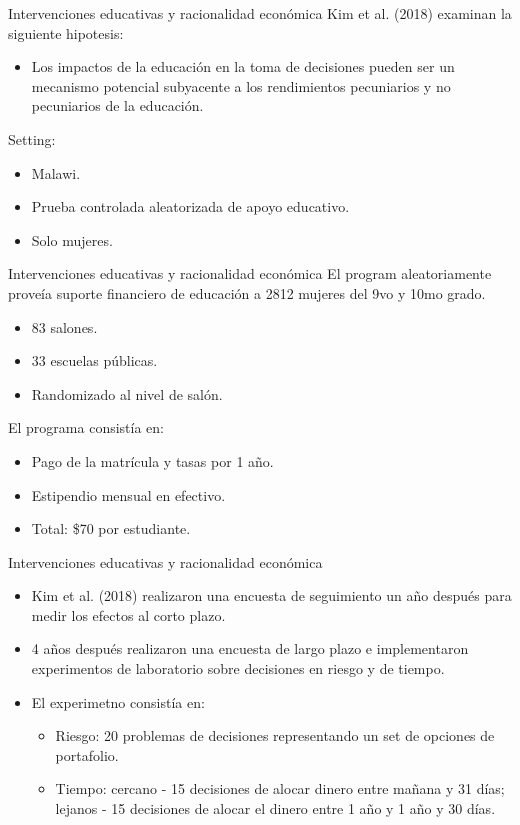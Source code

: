 \documentclass[11pt, aspectratio=169, compress]{beamer}
\begin{document}
\begin{frame}{Intervenciones educativas y racionalidad económica}
Kim et al. (2018) examinan la siguiente hipotesis: 
\begin{itemize}
	\item Los impactos de la educación en la toma de decisiones pueden ser un mecanismo potencial subyacente a los rendimientos pecuniarios y no pecuniarios de la educación. 
\end{itemize}
Setting: 
\begin{itemize}
	\item Malawi. 
	\item Prueba controlada aleatorizada de apoyo educativo. 
	\item Solo mujeres. 
\end{itemize}
\end{frame}
\begin{frame}{Intervenciones educativas y racionalidad económica}
El program aleatoriamente proveía suporte financiero de educación a 2812 mujeres del 9vo y 10mo grado. 
\begin{itemize}
	\item 83 salones. 
	\item 33 escuelas públicas. 
	\item Randomizado al nivel de salón. 
\end{itemize}
El programa consistía en: 
\begin{itemize}
	\item Pago de la matrícula y tasas por 1 año. 
	\item Estipendio mensual en efectivo. 
	\item Total: \$70 por estudiante.  
\end{itemize}
\end{frame}
\begin{frame}{Intervenciones educativas y racionalidad económica}
\begin{itemize}
	\item Kim et al. (2018) realizaron una encuesta de seguimiento un año después para medir los efectos al corto plazo. 
	\item 4 años después realizaron una encuesta de largo plazo e implementaron experimentos de laboratorio sobre decisiones en riesgo y de tiempo.
	\item  El experimetno consistía en: 
	\begin{itemize}
		\item Riesgo: 20 problemas de decisiones representando un set de opciones de portafolio.
		\item Tiempo: cercano - 15 decisiones de alocar dinero entre mañana y 31 días; lejanos - 15 decisiones de alocar el dinero entre 1 año y 1 año y 30 días.  
	\end{itemize}
\end{itemize}
\end{frame}
\end{document}
